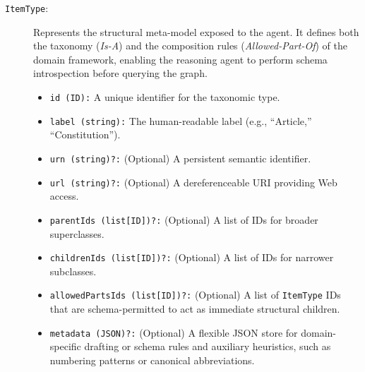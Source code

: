 \documentclass[11pt]{article}
\begin{document}
\begin{description}
    \item[\texttt{ItemType}:] Represents the structural meta-model exposed to the agent. It defines both the taxonomy (\textit{Is-A}) and the composition rules (\textit{Allowed-Part-Of}) of the domain framework, enabling the reasoning agent to perform schema introspection before querying the graph.
    \begin{itemize}
    \item \texttt{id (ID):} A unique identifier for the taxonomic type.
    \item \texttt{label (string):} The human-readable label (e.g., ``Article,'' ``Constitution'').
    \item \texttt{urn (string)?:} (Optional) A persistent semantic identifier.
    \item \texttt{url (string)?:} (Optional) A dereferenceable URI providing Web access.
    \item \texttt{parentIds (list[ID])?:} (Optional) A list of IDs for broader superclasses.
    \item \texttt{childrenIds (list[ID])?:} (Optional) A list of IDs for narrower subclasses.
    \item \texttt{allowedPartsIds (list[ID])?:} (Optional) A list of \texttt{ItemType} IDs that are schema-permitted to act as immediate structural children.
    \item \texttt{metadata (JSON)?:} (Optional) A flexible JSON store for domain-specific drafting or schema rules and auxiliary heuristics, such as numbering patterns or canonical abbreviations.
    \end{itemize}
    

\end{description}
\end{document}
